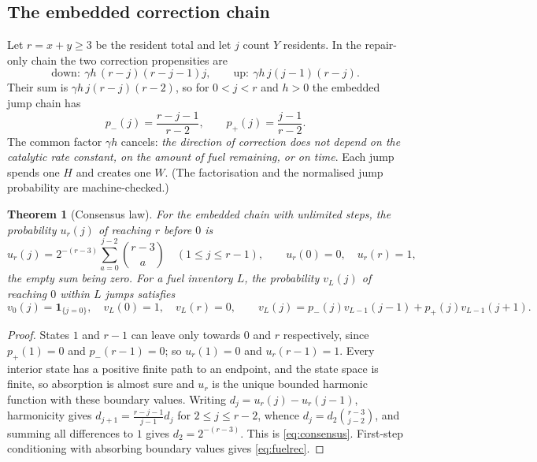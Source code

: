 \documentclass[11pt,a4paper]{article}
\theoremstyle{plain}
\newtheorem{theorem}{Theorem}[section]
\theoremstyle{definition}
\theoremstyle{remark}
\newcommand{\ind}{\mathbf 1}
\begin{document}
\subsection{The embedded correction chain}

Let $r=x+y\ge3$ be the resident total and let $j$ count $Y$ residents. In the repair-only
chain the two correction propensities are
\begin{equation}
\text{down}:\ \gamma h\,(r-j)(r-j-1)j,\qquad
\text{up}:\ \gamma h\,j(j-1)(r-j).
\end{equation}
Their sum is $\gamma h\,j(r-j)(r-2)$, so for $0<j<r$ and $h>0$ the embedded jump chain
has
\begin{equation}
p_-(j)=\frac{r-j-1}{r-2},\qquad p_+(j)=\frac{j-1}{r-2}.\label{eq:walk}
\end{equation}
The common factor $\gamma h$ cancels: \emph{the direction of correction does not depend on
the catalytic rate constant, on the amount of fuel remaining, or on time}. Each jump
spends one $H$ and creates one $W$. (The factorisation and the normalised jump
probability are machine-checked.)

\begin{theorem}[Consensus law]\label{thm:walk}
For the embedded chain with unlimited steps, the probability $u_r(j)$ of reaching $r$
before $0$ is
\begin{equation}
u_r(j)=2^{-(r-3)}\sum_{a=0}^{j-2}\binom{r-3}{a}\quad(1\le j\le r-1),\qquad
u_r(0)=0,\quad u_r(r)=1,\label{eq:consensus}
\end{equation}
the empty sum being zero. For a fuel inventory $L$, the probability $v_L(j)$ of reaching
$0$ within $L$ jumps satisfies
\begin{equation}
v_0(j)=\ind_{\{j=0\}},\quad v_L(0)=1,\quad v_L(r)=0,\qquad
v_L(j)=p_-(j)v_{L-1}(j-1)+p_+(j)v_{L-1}(j+1).\label{eq:fuelrec}
\end{equation}
\end{theorem}

\begin{proof}
States $1$ and $r-1$ can leave only towards $0$ and $r$ respectively, since $p_+(1)=0$
and $p_-(r-1)=0$; so $u_r(1)=0$ and $u_r(r-1)=1$. Every interior state has a positive
finite path to an endpoint, and the state space is finite, so absorption is almost sure
and $u_r$ is the unique bounded harmonic function with these boundary values. Writing
$d_j=u_r(j)-u_r(j-1)$, harmonicity gives $d_{j+1}=\frac{r-j-1}{j-1}d_j$ for
$2\le j\le r-2$, whence $d_j=d_2\binom{r-3}{j-2}$, and summing all differences to $1$
gives $d_2=2^{-(r-3)}$. This is \eqref{eq:consensus}. First-step conditioning with
absorbing boundary values gives \eqref{eq:fuelrec}.
\end{proof}
\end{document}
